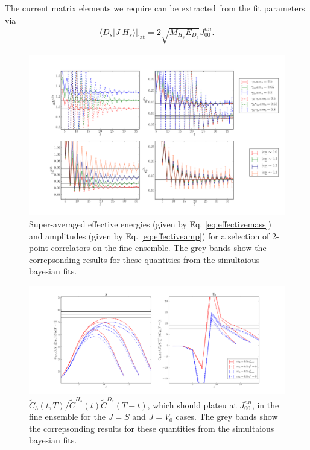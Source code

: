The current matrix elements we require can be extracted from the fit parameters via
\begin{align}
  \langle D_s| J | H_s \rangle |_{\text{lat}} = 2 \sqrt{M_{H_s}E_{D_s}} J^{nn}_{00}.
  \label{eq:currentfit}
\end{align}

\begin{figure}[htb!]
  \hspace{-30pt}
    \hspace{-10pt}
    \includegraphics[width=1.2\textwidth]{images/BsDs/fine_2pt_summary.pdf}
    \caption{
Super-averaged effective energies (given by Eq. \eqref{eq:effectivemass}) and amplitudes (given by Eq. \eqref{eq:effectiveamp}) for a selection of 2-point correlators on the fine ensemble. The grey bands show the correpsonding results for these quantities from the simultaious bayesian fits.  \label{fig:2ptcorrs_BsDs}}
\end{figure}

\begin{figure}[htb!]
    \hspace{-60pt}
    \includegraphics[width=1.3\textwidth]{images/BsDs/fine_3pt_summary.pdf}
    \caption{$\tilde{C}_3(t,T)/\tilde{C}^{H_s}(t) \tilde{C}^{D_s}(T-t)$, which should plateu at $J_{00}^{nn}$, in the fine ensemble for the $J=S$ and $J=V_0$ cases. The grey bands show the correpsonding results for these quantities from the simultaious bayesian fits.\label{fig:3ptcorrs_BsDs}}
\end{figure}

